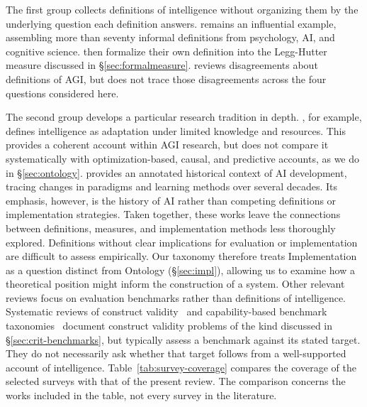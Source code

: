 \documentclass[acmsmall,screen,review,anonymous]{acmart}
\begin{document}
The first group collects definitions of intelligence without organizing them by the underlying question each definition answers.
%
\citet{legg2007collectiondefinitionsintelligence} remains an influential example, assembling more than seventy informal definitions from psychology, AI, and cognitive science.
%
\citet{legghutter2007} then formalize their own definition into the Legg-Hutter measure discussed in \S\ref{sec:formalmeasure}.
%
\citet{mitchell2024debates} reviews disagreements about definitions of AGI, but does not trace those disagreements across the four questions considered here.

The second group develops a particular research tradition in depth.
%
\citet{wang2019define}, for example, defines intelligence as adaptation under limited knowledge and resources.
%
This provides a coherent account within AGI research, but does not compare it systematically with optimization-based, causal, and predictive accounts, as we do in \S\ref{sec:ontology}.
%
\citet{schmidhuber2025annotatedhistorymodernai} provides an annotated historical context of AI development, tracing changes in paradigms and learning methods over several decades.
%
Its emphasis, however, is the history of AI rather than competing definitions or implementation strategies.
%
Taken together, these works leave the connections between definitions, measures, and implementation methods less thoroughly explored.
%
Definitions without clear implications for evaluation or implementation are difficult to assess empirically.
%
Our taxonomy therefore treats Implementation as a question distinct from Ontology (\S\ref{sec:impl}), allowing us to examine how a theoretical position might inform the construction of a system. 
%
Other relevant reviews focus on evaluation benchmarks rather than definitions of intelligence.
%
Systematic reviews of construct validity~\citep{bean2026measuring} and capability-based benchmark taxonomies~\citep{chang2024survey} document construct validity problems of the kind discussed in \S\ref{sec:crit-benchmarks}, but typically assess a benchmark against its stated target.
%
They do not necessarily ask whether that target follows from a well-supported account of intelligence.
%
Table~\ref{tab:survey-coverage} compares the coverage of the selected surveys with that of the present review.
%
The comparison concerns the works included in the table, not every survey in the literature.

\newcommand{\yes}{\textcolor{green!60!black}{Yes}}
\newcommand{\no}{\textcolor{red!70!black}{No}}
\newcommand{\partialtxt}{\textcolor{orange!85!black}{Partial}}
\end{document}
